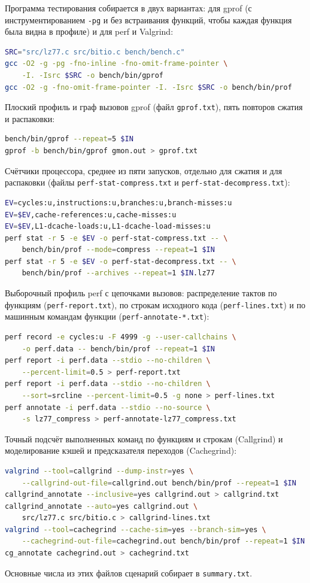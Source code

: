 Программа тестирования собирается в двух вариантах: для gprof (с
инструментированием \texttt{-pg} и без встраивания функций, чтобы каждая
функция была видна в профиле) и для perf и Valgrind:
\begin{lstlisting}[language=bash,numbers=none]
SRC="src/lz77.c src/bitio.c bench/bench.c"
gcc -O2 -g -pg -fno-inline -fno-omit-frame-pointer \
    -I. -Isrc $SRC -o bench/bin/gprof
gcc -O2 -g -fno-omit-frame-pointer -I. -Isrc $SRC -o bench/bin/prof
\end{lstlisting}

Плоский профиль и граф вызовов gprof (файл \texttt{gprof.txt}), пять
повторов сжатия и распаковки:
\begin{lstlisting}[language=bash,numbers=none]
bench/bin/gprof --repeat=5 $IN
gprof -b bench/bin/gprof gmon.out > gprof.txt
\end{lstlisting}

Счётчики процессора, среднее из пяти запусков, отдельно для сжатия и для
распаковки (файлы \texttt{perf-stat-compress.txt} и
\texttt{perf-stat-decompress.txt}):
\begin{lstlisting}[language=bash,numbers=none]
EV=cycles:u,instructions:u,branches:u,branch-misses:u
EV=$EV,cache-references:u,cache-misses:u
EV=$EV,L1-dcache-loads:u,L1-dcache-load-misses:u
perf stat -r 5 -e $EV -o perf-stat-compress.txt -- \
    bench/bin/prof --mode=compress --repeat=1 $IN
perf stat -r 5 -e $EV -o perf-stat-decompress.txt -- \
    bench/bin/prof --archives --repeat=1 $IN.lz77
\end{lstlisting}

Выборочный профиль perf с цепочками вызовов: распределение тактов по
функциям (\texttt{perf-report.txt}), по строкам исходного кода
(\texttt{perf-lines.txt}) и по машинным командам функции
(\texttt{perf-annotate-*.txt}):
\begin{lstlisting}[language=bash,numbers=none]
perf record -e cycles:u -F 4999 -g --user-callchains \
    -o perf.data -- bench/bin/prof --repeat=1 $IN
perf report -i perf.data --stdio --no-children \
    --percent-limit=0.5 > perf-report.txt
perf report -i perf.data --stdio --no-children \
    --sort=srcline --percent-limit=0.5 -g none > perf-lines.txt
perf annotate -i perf.data --stdio --no-source \
    -s lz77_compress > perf-annotate-lz77_compress.txt
\end{lstlisting}

Точный подсчёт выполненных команд по функциям и строкам (Callgrind) и
моделирование кэшей и предсказателя переходов (Cachegrind):
\begin{lstlisting}[language=bash,numbers=none]
valgrind --tool=callgrind --dump-instr=yes \
    --callgrind-out-file=callgrind.out bench/bin/prof --repeat=1 $IN
callgrind_annotate --inclusive=yes callgrind.out > callgrind.txt
callgrind_annotate --auto=yes callgrind.out \
    src/lz77.c src/bitio.c > callgrind-lines.txt
valgrind --tool=cachegrind --cache-sim=yes --branch-sim=yes \
    --cachegrind-out-file=cachegrind.out bench/bin/prof --repeat=1 $IN
cg_annotate cachegrind.out > cachegrind.txt
\end{lstlisting}
Основные числа из этих файлов сценарий собирает в \texttt{summary.txt}.

